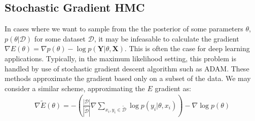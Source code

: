 




    
\subsection{Stochastic Gradient HMC}

In cases where we want to sample from the the posterior of some parameters $\theta$,  $p(\theta | \mathcal{D})$ for some dataset $\mathcal{D}$, it may be infeasable to calculate the gradient $\nabla E(\theta) = \nabla p(\theta) - \log{p(\bm{Y} | \theta, \bm{X})}$. 
This is often the case for deep learning applications.
Typically, in the maximum likelihood setting, this problem is handled by use of stochastic gradient descent algorithm such as ADAM. 
These methods approximate the gradient based only on a subset of the data. 
We may consider a similar scheme, approximating the $E$ gradient as:
\begin{align*}
    \nabla\tilde{E}(\theta) = -\left(\frac{|\mathcal{D}|}{|\tilde{\mathcal{D}}|}  \nabla \sum_{x_i, y_i\in \tilde{\mathcal{D}}} \log{p(y_i |\theta, x_i)}\right)  -\nabla \log{p(\theta)}
\end{align*}

